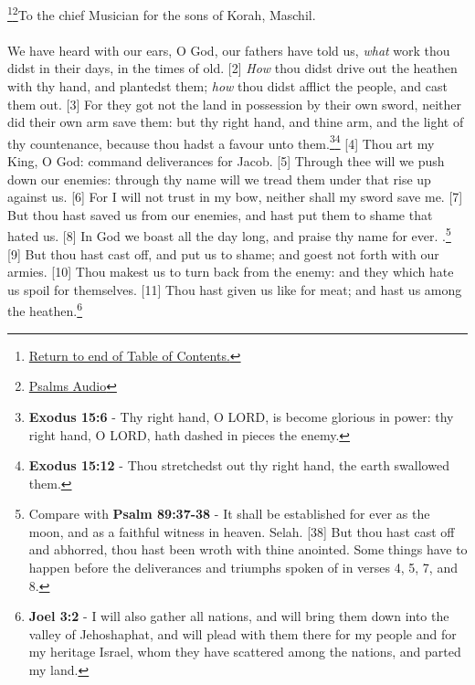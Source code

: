 \footnote{\textcolor[cmyk]{0.99998,1,0,0}{\hyperlink{TOC}{Return to end of Table of Contents.}}}\footnote{\href{https://www.audioverse.org/english/audiobibles/books/ENGKJV/O/Ps/1}{\textcolor[cmyk]{0.99998,1,0,0}{Psalms Audio}}}\textcolor[cmyk]{0.99998,1,0,0}{To the chief Musician for the sons of Korah, Maschil.}\\
\\
\textcolor[cmyk]{0.99998,1,0,0}{We have heard with our ears, O God, our fathers have told us, \emph{what} work thou didst in their days, in the times of old.}
[2] \textcolor[cmyk]{0.99998,1,0,0}{\emph{How} thou didst drive out the heathen with thy hand, and plantedst them; \emph{how} thou didst afflict the people, and cast them out.}
[3] \textcolor[cmyk]{0.99998,1,0,0}{For they got not the land in possession by their own sword, neither did their own arm save them: but thy right hand, and thine arm, and the light of thy countenance, because thou hadst a favour unto them.}\footnote{\textbf{Exodus 15:6} - Thy right hand, O LORD, is become glorious in power: thy right hand, O LORD, hath dashed in pieces the enemy.}\footnote{\textbf{Exodus 15:12} -  Thou stretchedst out thy right hand, the earth swallowed them.}
[4] \textcolor[cmyk]{0.99998,1,0,0}{Thou art my King, O God: command deliverances for Jacob.}
[5] \textcolor[cmyk]{0.99998,1,0,0}{Through thee will we push down our enemies: through thy name will we tread them under that rise up against us.}
[6] \textcolor[cmyk]{0.99998,1,0,0}{For I will not trust in my bow, neither shall my sword save me.}
[7] \textcolor[cmyk]{0.99998,1,0,0}{But thou hast saved us from our enemies, and hast put them to shame that hated us.}
[8] \textcolor[cmyk]{0.99998,1,0,0}{In God we boast all the day long, and praise thy name for ever. .}\footnote{Compare with \textbf{Psalm 89:37-38} - It shall be established for ever as the moon, and as a faithful witness in heaven. Selah. [38] But thou hast cast off and abhorred, thou hast been wroth with thine anointed. Some things have to happen before the deliverances and triumphs spoken of in verses 4, 5, 7, and 8.} 
[9] \textcolor[cmyk]{0.99998,1,0,0}{But thou hast cast off, and put us to shame; and goest not forth with our armies.}
[10] \textcolor[cmyk]{0.99998,1,0,0}{Thou makest us to turn back from the enemy: and they which hate us spoil for themselves.}
[11] \textcolor[cmyk]{0.99998,1,0,0}{Thou hast given us like  for meat; and hast  us among the heathen.}\footnote{\textbf{Joel 3:2} -  I will also gather all nations, and will bring them down into the valley of Jehoshaphat, and will plead with them there for my people and for my heritage Israel, whom they have scattered among the nations, and parted my land.}
